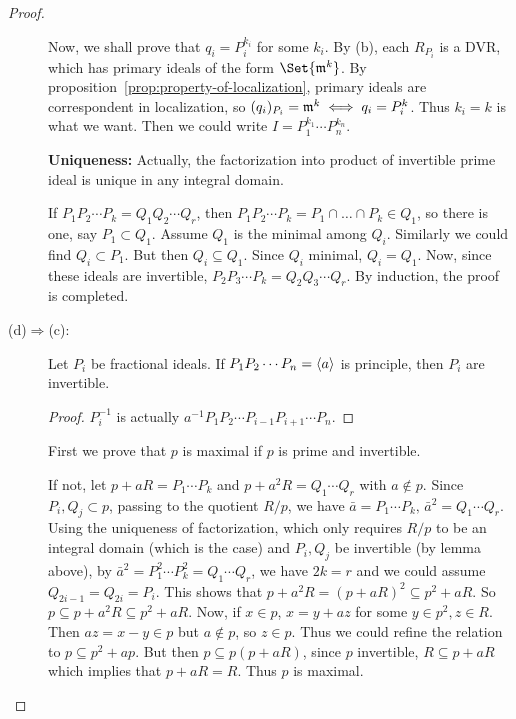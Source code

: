 \begin{theorem}
\begin{proof}
\begin{description}
        Now, we shall prove that $q_i = P_i^{k_i}$ for some $k_i$.
        By (b), each $R_{P_i}$ is a DVR, which has primary ideals
        of the form $\Set{\mf^k}$. By proposition~\ref{prop:property-of-localization},
        primary ideals are correspondent in localization,
        so $(q_i)_{P_i} = \mathfrak{m}^k \iff q_i = P_i^k$. Thus $k_i = k$
        is what we want. Then we could write $I = P_1^{k_1} \dotsm P_n^{k_n}$.

        {\bf Uniqueness:}
        Actually, the factorization into product of invertible
        prime ideal is unique in any integral domain.

        If $P_1 P_2 \dotsm P_k = Q_1 Q_2 \dotsm Q_r$,
        then $P_1 P_2 \dotsm P_k = P_1 \cap \dots \cap P_k \in Q_1$,
        so there is one, say $P_1 \subset Q_1$. Assume
        $Q_1$ is the minimal among $Q_i$. Similarly we could find $Q_i \subset P_1$.
        But then $Q_i \subseteq Q_1$. Since $Q_i$ minimal, $Q_i = Q_1$.
        Now, since these ideals are invertible,
        $P_2 P_3 \dotsm P_k = Q_2 Q_3 \dotsm Q_r$. By induction, the proof is completed.
      \item[\rm (d)$\Rightarrow$(c):]
        \begin{lemma}
          Let $P_i$ be fractional ideals. If $P_1 P_2 \dotsm P_n = \langle a\rangle$
          is principle, then $P_i$ are invertible.

          \begin{proof}
            $P_i^{-1}$ is actually $a^{-1} P_1 P_2 \dotsm P_{i-1} P_{i+1} \dotsm P_n$.
          \end{proof}
        \end{lemma}
        First we prove that $p$ is maximal if $p$ is prime and invertible.

        If not, let $p + aR = P_1 \dotsm P_k$ and $p + a^2 R = Q_1 \dotsm Q_r$
        with $a \not\in p$.
        Since $P_i, Q_j \subset p$, passing to the quotient $R/p$, we have
        $\bar{a} = P_1 \dotsm P_k, \, \bar{a}^2 = Q_1 \dotsm Q_r$.
        Using the uniqueness of factorization, which only requires $R/p$
        to be an integral domain (which is the case) and $P_i, Q_j$
        be invertible (by lemma above),
        by $\bar{a}^2 = P_1^2 \dotsm P_k^2 = Q_1 \dotsm Q_r$,
        we have $2k = r$ and we could assume $Q_{2i-1} = Q_{2i} = P_i$.
        This shows that $p + a^2 R = (p + aR)^2 \subseteq p^2 + aR$.
        So $p \subseteq p + a^2 R \subseteq p^2 + aR$. Now, if $x \in p$,
        $x = y + az$ for some $y \in p^2, z \in R$. Then $az = x - y \in p$
        but $a \not\in p$, so $z \in p$. Thus we could
        refine the relation to $p \subseteq p^2 + ap$.
        But then $p \subseteq p (p + aR)$, since $p$ invertible, $R \subseteq p + aR$
        which implies that $p + aR = R$. Thus $p$ is maximal.


\end{description}
\end{proof}
\end{theorem}

